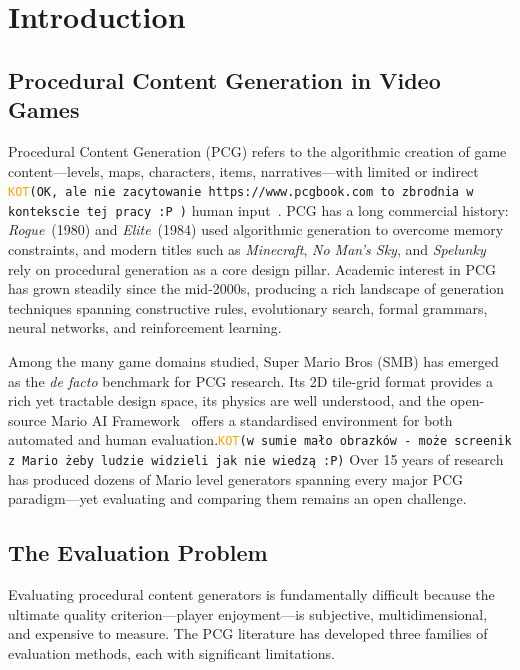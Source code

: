 \documentclass[shortabstract, mgr, english]{iithesis}
\author         {Antoni Czapski}
\date          {March 2026}
\newcommand{\DEBUG}[1]{{#1}} %
\newcommand{\KOT}[1]{\DEBUG{\tt{\textcolor{orange}{KOT}(}{#1}{)}}}
\begin{document}
\chapter{Introduction}
\label{ch:introduction}


\section{Procedural Content Generation in Video Games}
\label{sec:intro-pcg}

Procedural Content Generation (PCG) refers to the algorithmic creation of game
content---levels, maps, characters, items, narratives---with limited or indirect \KOT{OK, ale nie zacytowanie https://www.pcgbook.com to zbrodnia w kontekscie tej pracy :P }
human input~\citep{togelius2011search, summerville2018pcgml}. PCG has a long
commercial history: \emph{Rogue}~(1980) and \emph{Elite}~(1984) used algorithmic
generation to overcome memory constraints, and modern titles such as
\emph{Minecraft}, \emph{No Man's Sky}, and \emph{Spelunky} rely on procedural
generation as a core design pillar. Academic interest in PCG has grown steadily
since the mid-2000s, producing a rich landscape of generation techniques spanning
constructive rules, evolutionary search, formal grammars, neural networks, and
reinforcement learning.

Among the many game domains studied, Super Mario Bros (SMB) has emerged as the
\emph{de facto} benchmark for PCG research. Its 2D tile-grid format provides a
rich yet tractable design space, its physics are well understood, and the
open-source Mario AI Framework~\citep{karakovskiy2012marioai} offers a
standardised environment for both automated and human evaluation.\KOT{w sumie mało obrazków - może screenik z Mario żeby ludzie widzieli jak nie wiedzą :P} Over 15 years
of research has produced dozens of Mario level generators spanning every major
PCG paradigm---yet evaluating and comparing them remains an open challenge.

\section{The Evaluation Problem}
\label{sec:intro-evaluation-problem}

Evaluating procedural content generators is fundamentally difficult because the
ultimate quality criterion---player enjoyment---is subjective, multidimensional,
and expensive to measure. The PCG literature has developed three families of
evaluation methods, each with significant limitations.
\end{document}

